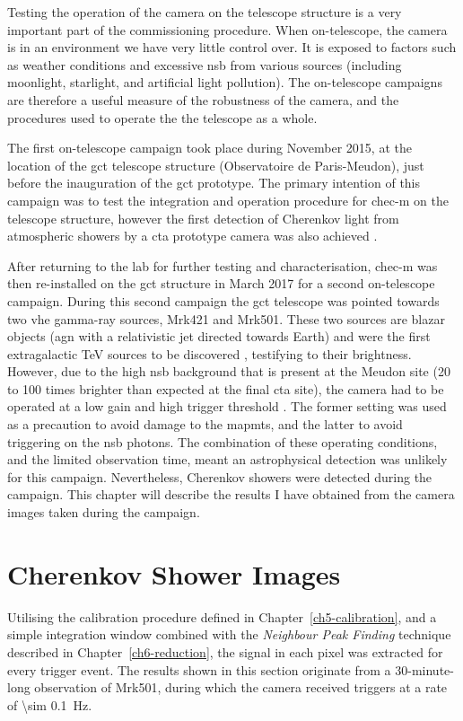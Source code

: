 Testing the operation of the camera on the telescope structure is a very important part of the commissioning procedure. When on-telescope, the camera is in an environment we have very little control over. It is exposed to factors such as weather conditions and excessive \gls{nsb} from various sources (including moonlight, starlight, and artificial light pollution). The on-telescope campaigns are therefore a useful measure of the robustness of the camera, and the procedures used to operate the the telescope as a whole.

The first on-telescope campaign took place during November 2015, at the location of the \gls{gct} telescope structure (Observatoire de Paris-Meudon), just before the inauguration of the \gls{gct} prototype. The primary intention of this campaign was to test the integration and operation procedure for \gls{chec-m} on the telescope structure, however the first detection of Cherenkov light from atmospheric showers by a \gls{cta} prototype camera was also achieved \cite{Watson2017}. 

After returning to the lab for further testing and characterisation, \gls{chec-m} was then re-installed on the \gls{gct} structure in March 2017 for a second on-telescope campaign. During this second campaign the \gls{gct} telescope was pointed towards two \gls{vhe} gamma-ray sources, Mrk421 and Mrk501. These two sources are blazar objects (\gls{agn} with a relativistic jet directed towards Earth) and were the first extragalactic \si{TeV} sources to be discovered \cite{Punch1992, Quinn1996}, testifying to their brightness. However, due to the high \gls{nsb} background that is present at the Meudon site (20 to 100 times brighter than expected at the final \gls{cta} site), the camera had to be operated at a low gain and high trigger threshold \cite{Zorn2017}. The former setting was used as a precaution to avoid damage to the \glspl{mapmt}, and the latter to avoid triggering on the \gls{nsb} photons. The combination of these operating conditions, and the limited observation time, meant an astrophysical detection was unlikely for this campaign. Nevertheless, Cherenkov showers were detected during the campaign. This chapter will describe the results I have obtained from the camera images taken during the campaign.

\section{Cherenkov Shower Images}

Utilising the calibration procedure defined in Chapter~\ref{ch5-calibration}, and a simple integration window combined with the \textit{Neighbour Peak Finding} technique described in Chapter~\ref{ch6-reduction}, the signal in each pixel was extracted for every trigger event. The results shown in this section originate from a 30-minute-long observation of Mrk501, during which the camera received triggers at a rate of \SI{\sim 0.1}{Hz}.

